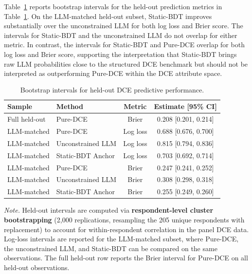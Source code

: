 \documentclass[11pt]{article}
\begin{document}
Table~\ref{tab:bootstrap_heldout} reports bootstrap intervals for the held-out prediction metrics in Table~\ref{tab:bootstrap_heldout}. On the LLM-matched held-out subset, Static-BDT improves substantially over the unconstrained LLM for both log loss and Brier score. The intervals for Static-BDT and the unconstrained LLM do not overlap for either metric. In contrast, the intervals for Static-BDT and Pure-DCE overlap for both log loss and Brier score, supporting the interpretation that Static-BDT brings raw LLM probabilities close to the structured DCE benchmark but should not be interpreted as outperforming Pure-DCE within the DCE attribute space.

\begin{table}[h]
\centering
\caption{Bootstrap intervals for held-out DCE predictive performance.}
\label{tab:bootstrap_heldout}
\small
\begin{tabular}{l l c c}
\toprule
Sample & Method & Metric & Estimate [95\% CI] \\
\midrule
Full held-out & Pure-DCE & Brier & 0.208 [0.201, 0.214] \\
\midrule
LLM-matched & Pure-DCE & Log loss & 0.688 [0.676, 0.700] \\
LLM-matched & Unconstrained LLM & Log loss & 0.815 [0.794, 0.836] \\
LLM-matched & Static-BDT Anchor & Log loss & 0.703 [0.692, 0.714] \\
\midrule
LLM-matched & Pure-DCE & Brier & 0.247 [0.241, 0.252] \\
LLM-matched & Unconstrained LLM & Brier & 0.308 [0.298, 0.318] \\
LLM-matched & Static-BDT Anchor & Brier & 0.255 [0.249, 0.260] \\
\bottomrule
\end{tabular}

\vspace{0.4em}
\begin{minipage}{0.95\textwidth}
\small
\textit{Note.} Held-out intervals are computed via \textbf{respondent-level cluster bootstrapping} (2,000 replications, resampling the 205 unique respondents with replacement) to account for within-respondent correlation in the panel DCE data. Log-loss intervals are reported for the LLM-matched subset, where Pure-DCE, the unconstrained LLM, and Static-BDT can be compared on the same observations. The full held-out row reports the Brier interval for Pure-DCE on all held-out observations.
\end{minipage}
\end{table}
\end{document}
